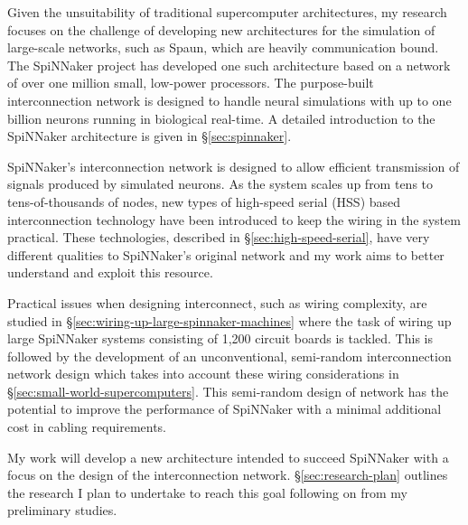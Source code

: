 		Given the unsuitability of traditional supercomputer architectures, my
		research focuses on the challenge of developing new architectures for the
		simulation of large-scale networks, such as Spaun, which are heavily
		communication bound.  The SpiNNaker project \cite{furber06} has developed
		one such architecture based on a network of over one million small,
		low-power processors. The purpose-built interconnection network is designed
		to handle neural simulations with up to one billion neurons running in
		biological real-time. A detailed introduction to the SpiNNaker architecture
		is given in \S\ref{sec:spinnaker}.
		
		
		SpiNNaker's interconnection network is designed to allow efficient
		transmission of signals produced by simulated neurons. As the system scales
		up from tens to tens-of-thousands of nodes, new types of high-speed serial
		(HSS) based interconnection technology have been introduced to keep the
		wiring in the system practical. These technologies, described in
		\S\ref{sec:high-speed-serial}, have very different qualities to SpiNNaker's
		original network and my work aims to better understand and exploit this
		resource.
		
		Practical issues when designing interconnect, such as wiring complexity, are
		studied in \S\ref{sec:wiring-up-large-spinnaker-machines} where the task of
		wiring up large SpiNNaker systems consisting of 1,200 circuit boards is
		tackled. This is followed by the development of an unconventional,
		semi-random interconnection network design which takes into account these
		wiring considerations in \S\ref{sec:small-world-supercomputers}. This
		semi-random design of network has the potential to improve the performance
		of SpiNNaker with a minimal additional cost in cabling requirements.
	
		My work will develop a new architecture intended to succeed SpiNNaker with a
		focus on the design of the interconnection network.
		\S\ref{sec:research-plan} outlines the research I plan to undertake to reach
		this goal following on from my preliminary studies.
